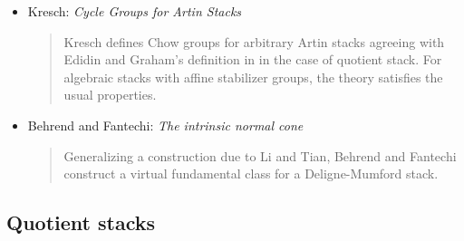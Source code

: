 \begin{itemize}
\item
Kresch: \emph{Cycle Groups for Artin Stacks} \cite{kresch_cycle}
\begin{quote}
Kresch defines Chow groups for arbitrary Artin stacks agreeing with Edidin and
Graham's definition in \cite{edidin-graham} in the case of quotient stack. For
algebraic stacks with affine stabilizer groups, the theory satisfies the usual
properties.
\end{quote}
\item Behrend and Fantechi: \emph{The intrinsic normal cone}
\cite{behrend-fantechi}
\begin{quote}
Generalizing a construction due to Li and Tian, Behrend and Fantechi construct
a virtual fundamental class for a Deligne-Mumford stack.
\end{quote}
\end{itemize}


\subsection{Quotient stacks}
\label{subsection-quotient-stacks}

